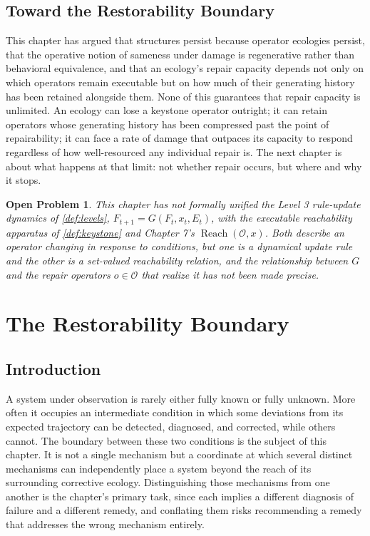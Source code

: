 \documentclass[12pt]{report}
\newtheorem{openproblem}[definition]{Open Problem}
\newcommand{\Reach}{\ensuremath{\operatorname{Reach}}}
\begin{document}
\section{Toward the Restorability Boundary}

This chapter has argued that structures persist because operator
ecologies persist, that the operative notion of sameness under damage is
regenerative rather than behavioral equivalence, and that an ecology's
repair capacity depends not only on which operators remain executable but
on how much of their generating history has been retained alongside
them. None of this guarantees that repair capacity is unlimited. An
ecology can lose a keystone operator outright; it can retain operators
whose generating history has been compressed past the point of
repairability; it can face a rate of damage that outpaces its capacity to
respond regardless of how well-resourced any individual repair is. The
next chapter is about what happens at that limit: not whether repair
occurs, but where and why it stops.

\begin{openproblem}
This chapter has not formally unified the Level 3 rule-update dynamics of
\cref{def:levels}, $F_{t+1} = G(F_t, x_t, E_t)$, with the executable
reachability apparatus of \cref{def:keystone} and Chapter 7's
$\Reach(\mathcal{O},x)$. Both describe an operator changing in response to
conditions, but one is a dynamical update rule and the other is a
set-valued reachability relation, and the relationship between $G$ and
the repair operators $o \in \mathcal{O}$ that realize it has not been made
precise.
\end{openproblem}

\chapter{The Restorability Boundary}

\section{Introduction}

A system under observation is rarely either fully known or fully unknown.
More often it occupies an intermediate condition in which some deviations
from its expected trajectory can be detected, diagnosed, and corrected,
while others cannot. The boundary between these two conditions is the
subject of this chapter. It is not a single mechanism but a coordinate at
which several distinct mechanisms can independently place a system beyond
the reach of its surrounding corrective ecology. Distinguishing those
mechanisms from one another is the chapter's primary task, since each
implies a different diagnosis of failure and a different remedy, and
conflating them risks recommending a remedy that addresses the wrong
mechanism entirely.
\end{document}
